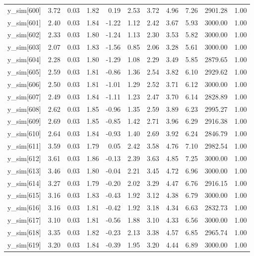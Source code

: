 \begin{table}[ht]
\begin{tabular}{rrrrrrrrrrr}
  y\_sim[600] & 3.72 & 0.03 & 1.82 & 0.19 & 2.53 & 3.72 & 4.96 & 7.26 & 2901.28 & 1.00 \\ 
  y\_sim[601] & 2.40 & 0.03 & 1.84 & -1.22 & 1.12 & 2.42 & 3.67 & 5.93 & 3000.00 & 1.00 \\ 
  y\_sim[602] & 2.33 & 0.03 & 1.80 & -1.24 & 1.13 & 2.30 & 3.53 & 5.82 & 3000.00 & 1.00 \\ 
  y\_sim[603] & 2.07 & 0.03 & 1.83 & -1.56 & 0.85 & 2.06 & 3.28 & 5.61 & 3000.00 & 1.00 \\ 
  y\_sim[604] & 2.28 & 0.03 & 1.80 & -1.29 & 1.08 & 2.29 & 3.49 & 5.85 & 2879.65 & 1.00 \\ 
  y\_sim[605] & 2.59 & 0.03 & 1.81 & -0.86 & 1.36 & 2.54 & 3.82 & 6.10 & 2929.62 & 1.00 \\ 
  y\_sim[606] & 2.50 & 0.03 & 1.81 & -1.01 & 1.29 & 2.52 & 3.71 & 6.12 & 3000.00 & 1.00 \\ 
  y\_sim[607] & 2.49 & 0.03 & 1.84 & -1.11 & 1.23 & 2.47 & 3.70 & 6.14 & 2828.89 & 1.00 \\ 
  y\_sim[608] & 2.62 & 0.03 & 1.85 & -0.96 & 1.35 & 2.59 & 3.89 & 6.23 & 2995.27 & 1.00 \\ 
  y\_sim[609] & 2.69 & 0.03 & 1.85 & -0.85 & 1.42 & 2.71 & 3.96 & 6.29 & 2916.38 & 1.00 \\ 
  y\_sim[610] & 2.64 & 0.03 & 1.84 & -0.93 & 1.40 & 2.69 & 3.92 & 6.24 & 2846.79 & 1.00 \\ 
  y\_sim[611] & 3.59 & 0.03 & 1.79 & 0.05 & 2.42 & 3.58 & 4.76 & 7.10 & 2982.54 & 1.00 \\ 
  y\_sim[612] & 3.61 & 0.03 & 1.86 & -0.13 & 2.39 & 3.63 & 4.85 & 7.25 & 3000.00 & 1.00 \\ 
  y\_sim[613] & 3.46 & 0.03 & 1.80 & -0.04 & 2.21 & 3.45 & 4.72 & 6.96 & 3000.00 & 1.00 \\ 
  y\_sim[614] & 3.27 & 0.03 & 1.79 & -0.20 & 2.02 & 3.29 & 4.47 & 6.76 & 2916.15 & 1.00 \\ 
  y\_sim[615] & 3.16 & 0.03 & 1.83 & -0.43 & 1.92 & 3.12 & 4.38 & 6.79 & 3000.00 & 1.00 \\ 
  y\_sim[616] & 3.16 & 0.03 & 1.81 & -0.42 & 1.92 & 3.18 & 4.34 & 6.63 & 2832.73 & 1.00 \\ 
  y\_sim[617] & 3.10 & 0.03 & 1.81 & -0.56 & 1.88 & 3.10 & 4.33 & 6.56 & 3000.00 & 1.00 \\ 
  y\_sim[618] & 3.35 & 0.03 & 1.82 & -0.23 & 2.13 & 3.38 & 4.57 & 6.85 & 2965.74 & 1.00 \\ 
  y\_sim[619] & 3.20 & 0.03 & 1.84 & -0.39 & 1.95 & 3.20 & 4.44 & 6.89 & 3000.00 & 1.00 \\ 

\end{tabular}
\end{table}
